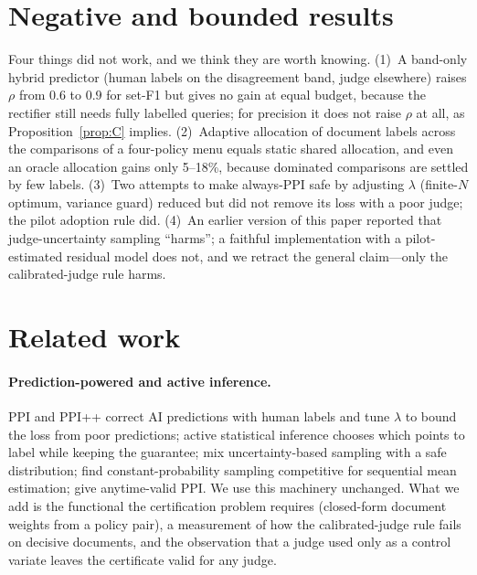 \documentclass{article}
\begin{document}
\section{Negative and bounded results}\label{sec:negative}
Four things did not work, and we think they are worth knowing. (1)~A band-only hybrid predictor (human labels on the disagreement band, judge elsewhere) raises $\rho$ from $0.6$ to $0.9$ for set-F1 but gives no gain at equal budget, because the rectifier still needs fully labelled queries; for precision it does not raise $\rho$ at all, as Proposition~\ref{prop:C} implies. (2)~Adaptive allocation of document labels across the comparisons of a four-policy menu equals static shared allocation, and even an oracle allocation gains only 5--18\%, because dominated comparisons are settled by few labels. (3)~Two attempts to make always-PPI safe by adjusting $\lambda$ (finite-$N$ optimum, variance guard) reduced but did not remove its loss with a poor judge; the pilot adoption rule did. (4)~An earlier version of this paper reported that judge-uncertainty sampling ``harms''; a faithful implementation with a pilot-estimated residual model does not, and we retract the general claim---only the calibrated-judge rule harms.

\section{Related work}\label{sec:related}
\paragraph{Prediction-powered and active inference.} PPI \citep{angelopoulos2023ppi} and PPI++ \citep{angelopoulos2023ppipp} correct AI predictions with human labels and tune $\lambda$ to bound the loss from poor predictions; active statistical inference \citep{zrnic2024active} chooses which points to label while keeping the guarantee; \citet{li2025robust} mix uncertainty-based sampling with a safe distribution; \citet{sfyraki2026revisiting} find constant-probability sampling competitive for sequential mean estimation; \citet{kilian2025anytime} give anytime-valid PPI. We use this machinery unchanged. What we add is the functional the certification problem requires (closed-form document weights from a policy pair), a measurement of how the calibrated-judge rule fails on decisive documents, and the observation that a judge used only as a control variate leaves the certificate valid for any judge.
\end{document}
